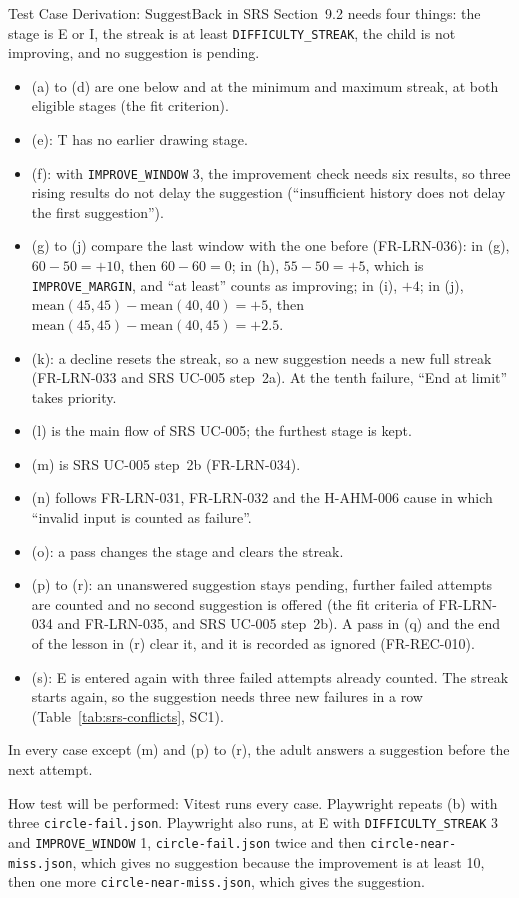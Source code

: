\documentclass[12pt, titlepage]{article}
\begin{document}
\begin{enumerate}
Test Case Derivation: $\mathrm{SuggestBack}$ in SRS Section~9.2
needs four things: the stage is E or I, the streak is at least
\texttt{DIFFICULTY\_STREAK}, the child is not improving, and no suggestion
is pending.
\begin{itemize}
\item (a) to (d) are one below and at the minimum and maximum streak, at
both eligible stages (the fit criterion).
\item (e): T has no earlier drawing stage.
\item (f): with \texttt{IMPROVE\_WINDOW} 3, the improvement check needs six
results, so three rising results do not delay the suggestion (``insufficient
history does not delay the first suggestion'').
\item (g) to (j) compare the last window with the one before (FR-LRN-036): in (g),
$60 - 50 = +10$, then $60 - 60 = 0$; in (h), $55 - 50 = +5$, which is
\texttt{IMPROVE\_MARGIN}, and ``at least'' counts as improving; in (i),
$+4$; in (j), $\mathrm{mean}(45, 45) - \mathrm{mean}(40, 40) = +5$, then
$\mathrm{mean}(45, 45) - \mathrm{mean}(40, 45) = +2.5$.
\item (k): a decline resets the streak, so a new suggestion needs a new full
streak (FR-LRN-033 and SRS UC-005 step~2a). At the tenth failure, ``End at
limit'' takes priority.
\item (l) is the main flow of SRS UC-005; the furthest stage is kept.
\item (m) is SRS UC-005 step~2b (FR-LRN-034).
\item (n) follows FR-LRN-031, FR-LRN-032 and the H-AHM-006 cause in which
``invalid input is counted as failure''.
\item (o): a pass changes the stage and clears the streak.
\item (p) to (r): an unanswered suggestion stays pending, further failed
attempts are counted and no second suggestion is offered (the fit criteria of
FR-LRN-034 and FR-LRN-035, and SRS UC-005 step~2b). A pass in (q) and the end of the lesson in (r) clear
it, and it is recorded as ignored (FR-REC-010).
\item (s): E is entered again with three failed attempts already counted.
The streak starts again, so the suggestion needs three new failures in a
row (Table~\ref{tab:srs-conflicts}, SC1).
\end{itemize}
In every case except (m) and (p) to (r), the adult answers a suggestion
before the next attempt.

How test will be performed: Vitest runs every case. Playwright repeats (b)
with three \texttt{circle-\allowbreak{}fail.json}. Playwright also runs,
at E with \texttt{DIFFICULTY\_STREAK} 3 and \texttt{IMPROVE\_WINDOW} 1,
\texttt{circle-\allowbreak{}fail.json} twice and then
\texttt{circle-\allowbreak{}near-\allowbreak{}miss.json}, which gives no
suggestion because the improvement is at least 10, then one more
\texttt{circle-\allowbreak{}near-\allowbreak{}miss.json}, which gives the
suggestion.


\end{enumerate}
\end{document}
